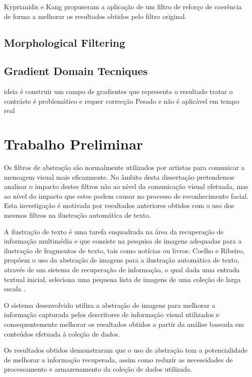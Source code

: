 Kyprianidis e Kang \cite{KK} propuseram a aplicação de um filtro de reforço de coerência de forma a melhorar os resultados obtidos pelo filtro original.

\subsection{Morphological Filtering}

\subsection{Gradient Domain Tecniques}
ideia é construir um campo de gradientes que representa o resultado tratar o contráste é problemático e requer correcção
Pesado e não é aplicável em tempo real


\section{Trabalho Preliminar}
Os filtros de abstração são normalmente utilizados por artistas para comunicar a mensagem visual mais eficazmente.  No âmbito desta dissertação pretendemos analisar o impacto destes filtros não ao nível da comunicação visual efetuada, mas ao nível do impacto que estes podem causar no processo de reconhecimento facial. Esta investigação é motivada por resultados anteriores obtidos com o uso dos mesmos filtros na ilustração automática de texto.

A ilustração de texto é uma tarefa enquadrada na área da recuperação de informação multimédia e que consiste na pesquisa de imagens adequadas para a ilustração de fragmentos de texto, tais como notícias ou livros. Coelho e Ribeiro, propõem o uso da abstração de imagens para a ilustração automática de texto, através de um sistema de recuperação de informação, o qual dada uma entrada textual inicial, seleciona uma pequena lista de imagens de uma coleção de larga escala \cite{Coelho:2012:IAC:2260641.2260676}.

O sistema desenvolvido utiliza a abstração de imagens para melhorar a informação capturada pelos descritores de informação visual utilizados e consequentemente melhorar os resultados obtidos a partir da análise baseada em conteúdos efetuada à coleção de dados.

Os resultados obtidos demonstraram que o uso de abstração tem a potencialidade de melhorar a informação recuperada, assim como reduzir as necessidades de processamento e armazenamento da coleção de dados utilizada.